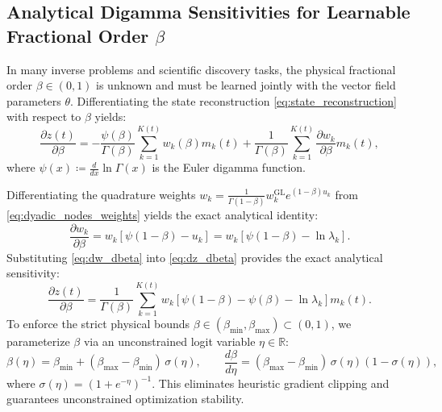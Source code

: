 \documentclass[11pt,a4paper]{article}
\theoremstyle{plain}
\theoremstyle{definition}
\newcommand{\R}{\mathbb{R}}
\begin{document}
\subsection{Analytical Digamma Sensitivities for Learnable Fractional Order $\beta$}
\label{subsec:learnable_beta}
In many inverse problems and scientific discovery tasks, the physical fractional order $\beta \in (0, 1)$ is unknown and must be learned jointly with the vector field parameters $\theta$. Differentiating the state reconstruction \cref{eq:state_reconstruction} with respect to $\beta$ yields:
\begin{equation}
    \frac{\partial z(t)}{\partial \beta} = -\frac{\psi(\beta)}{\Gamma(\beta)} \sum_{k=1}^{K(t)} w_k(\beta) m_k(t) + \frac{1}{\Gamma(\beta)} \sum_{k=1}^{K(t)} \frac{\partial w_k}{\partial \beta} m_k(t),
    \label{eq:dz_dbeta}
\end{equation}
where $\psi(x) \coloneqq \frac{d}{dx} \ln \Gamma(x)$ is the Euler digamma function.

Differentiating the quadrature weights $w_k = \frac{1}{\Gamma(1 - \beta)} w_k^{\mathrm{GL}} e^{(1 - \beta) u_k}$ from \cref{eq:dyadic_nodes_weights} yields the exact analytical identity:
\begin{equation}
    \frac{\partial w_k}{\partial \beta} = w_k \left[ \psi(1 - \beta) - u_k \right] = w_k \left[ \psi(1 - \beta) - \ln \lambda_k \right].
    \label{eq:dw_dbeta}
\end{equation}
Substituting \cref{eq:dw_dbeta} into \cref{eq:dz_dbeta} provides the exact analytical sensitivity:
\begin{equation}
    \frac{\partial z(t)}{\partial \beta} = \frac{1}{\Gamma(\beta)} \sum_{k=1}^{K(t)} w_k \left[ \psi(1 - \beta) - \psi(\beta) - \ln \lambda_k \right] m_k(t).
    \label{eq:analytical_beta_gradient}
\end{equation}
To enforce the strict physical bounds $\beta \in (\beta_{\min}, \beta_{\max}) \subset (0, 1)$, we parameterize $\beta$ via an unconstrained logit variable $\eta \in \R$:
\begin{equation}
    \beta(\eta) = \beta_{\min} + (\beta_{\max} - \beta_{\min}) \, \sigma(\eta), \qquad \frac{d\beta}{d\eta} = (\beta_{\max} - \beta_{\min}) \, \sigma(\eta) (1 - \sigma(\eta)),
    \label{eq:sigmoid_beta}
\end{equation}
where $\sigma(\eta) = (1 + e^{-\eta})^{-1}$. This eliminates heuristic gradient clipping and guarantees unconstrained optimization stability.
\end{document}
